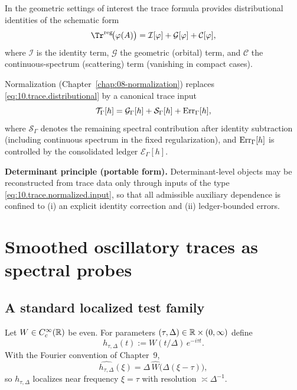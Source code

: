 In the geometric settings of interest the trace formula provides distributional identities of the schematic form
\begin{equation}\label{eq:10.trace.distributional}
\Tr^{\mathrm{reg}}\!\bigl(\varphi(A)\bigr)
=
\mathcal I[\varphi]+\mathcal G[\varphi]+\mathcal C[\varphi],
\end{equation}
where $\mathcal I$ is the identity term, $\mathcal G$ the geometric (orbital) term, and $\mathcal C$ the continuous-spectrum
(scattering) term (vanishing in compact cases).

Normalization (Chapter~\ref{chap:08-normalization}) replaces \eqref{eq:10.trace.distributional} by a canonical trace input
\begin{equation}\label{eq:10.trace.normalized.input}
\mathcal T_\Gamma[h]=\mathcal G_\Gamma[h]+\mathcal S_\Gamma[h]+\mathrm{Err}_\Gamma[h],
\end{equation}
where $\mathcal S_\Gamma$ denotes the remaining spectral contribution after identity subtraction (including continuous spectrum
in the fixed regularization), and $\mathrm{Err}_\Gamma[h]$ is controlled by the consolidated ledger $\mathcal E_\Gamma[h]$.

\medskip
\noindent\textbf{Determinant principle (portable form).}
Determinant-level objects may be reconstructed from trace data only through inputs of the type \eqref{eq:10.trace.normalized.input},
so that all admissible auxiliary dependence is confined to (i) an explicit identity correction and (ii) ledger-bounded errors.

\section{Smoothed oscillatory traces as spectral probes}
\label{sec:10.osc}

\subsection{A standard localized test family}
\label{subsec:10.osc.family}

Let $W\in C_c^\infty(\mathbb{R})$ be even. For parameters $(\tau,\Delta)\in\mathbb{R}\times(0,\infty)$ define
\begin{equation}\label{eq:10.htaudelta}
h_{\tau,\Delta}(t):=W(t/\Delta)\,e^{-i\tau t}.
\end{equation}
With the Fourier convention of Chapter~9,
\begin{equation}\label{eq:10.hhat}
\widehat{h_{\tau,\Delta}}(\xi)=\Delta\,\widehat W\bigl(\Delta(\xi-\tau)\bigr),
\end{equation}
so $h_{\tau,\Delta}$ localizes near frequency $\xi=\tau$ with resolution $\asymp \Delta^{-1}$.

